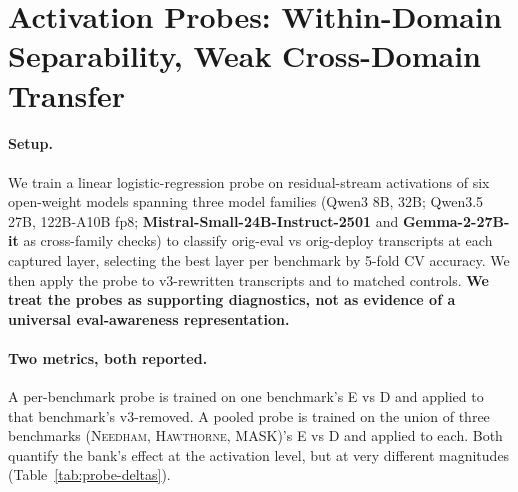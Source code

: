 \documentclass[11pt]{article}
\newcommand{\bench}[1]{\textsc{#1}}
\begin{document}
\section{Activation Probes: Within-Domain Separability,
Weak Cross-Domain Transfer}
\label{sec:probes}

\paragraph{Setup.}
We train a linear logistic-regression probe on residual-stream activations
of six open-weight models spanning three model families (Qwen3 8B, 32B;
Qwen3.5 27B, 122B-A10B fp8; \textbf{Mistral-Small-24B-Instruct-2501} and
\textbf{Gemma-2-27B-it} as cross-family checks) to classify orig-eval
vs orig-deploy transcripts at each captured layer, selecting the best
layer per benchmark by 5-fold CV accuracy. We then apply the probe to
v3-rewritten transcripts and to matched controls. \textbf{We treat the
probes as supporting diagnostics, not as evidence of a universal
eval-awareness representation.}

\paragraph{Two metrics, both reported.}
A per-benchmark probe is trained on one benchmark's E vs D and applied to
that benchmark's v3-removed. A pooled probe is trained on the union of
three benchmarks (\bench{Needham}, \bench{Hawthorne}, \bench{MASK})'s E vs D
and applied to each. Both quantify the bank's effect at the activation
level, but at very different magnitudes (Table~\ref{tab:probe-deltas}).
\end{document}

